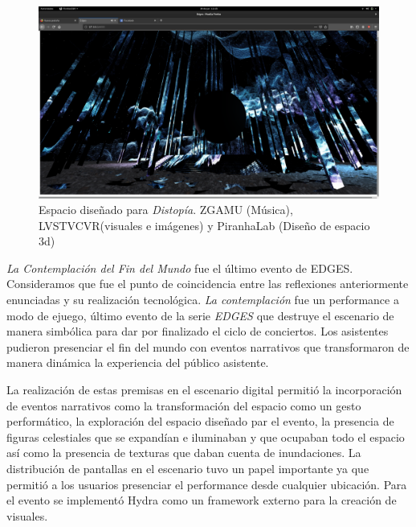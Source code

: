 \begin{figure}
  \includegraphics[width=\textwidth]{img/edges4.png}
  \caption{Espacio diseñado para \emph{Distopía}. ZGAMU (Música), LVSTVCVR(visuales e imágenes) y PiranhaLab (Diseño de espacio 3d)}
\end{figure}



\textit{La Contemplación del Fin del Mundo} fue el último evento de EDGES. Consideramos que fue el punto de coincidencia entre las reflexiones anteriormente enunciadas y su realización tecnológica. \textit{La contemplación} fue un performance a modo de ejuego, último evento de la serie \textit{EDGES} que destruye el escenario de manera simbólica para dar por finalizado el ciclo de conciertos. Los asistentes pudieron presenciar el fin del mundo con eventos narrativos que transformaron de manera dinámica la experiencia del público asistente. 

La realización de estas premisas en el escenario digital permitió la incorporación de eventos narrativos como la transformación del espacio como un gesto performático, la exploración del espacio diseñado par el evento, la presencia de figuras celestiales que se expandían e iluminaban y que ocupaban todo el espacio así como la presencia de texturas que daban cuenta de inundaciones. La distribución de pantallas en el escenario tuvo un papel importante ya que permitió a los usuarios presenciar el performance desde cualquier ubicación. Para el evento se implementó Hydra \citep{hydra} como un framework externo para la creación de visuales.


